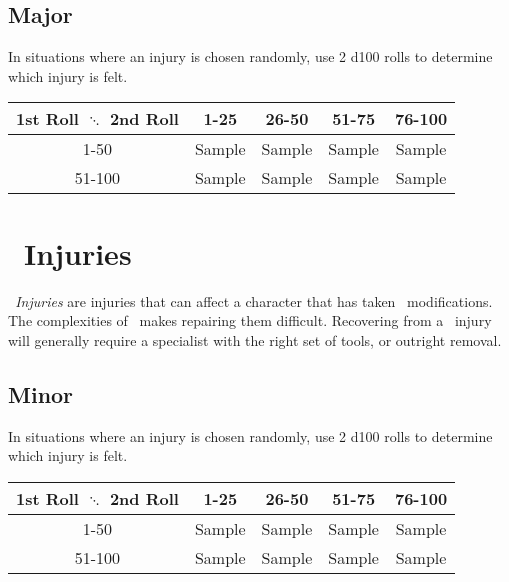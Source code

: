 \subsection{Major}
In situations where an injury is chosen randomly, use 2 d100 rolls to determine which injury is felt.
\begin{center}
\begin{tabular}{c | c | c | c | c}
1st Roll $\ddots$ 2nd Roll & 1-25 & 26-50 & 51-75 & 76-100 \\
\hline
1-50 & Sample & Sample & Sample & Sample\\
\hline
51-100 & Sample & Sample & Sample & Sample\\
\end{tabular}
\end{center}
\begin{multicols}{2}

\end{multicols}

\section{\cybert\ Injuries}\label{sec:cybr_injuries}
\emph{\cybert\ Injuries} are injuries that can affect a character that has taken \cybert\ modifications. The complexities of \cybert\ makes repairing them difficult. Recovering from a \cybert\ injury will generally require a specialist with the right set of tools, or outright removal.

\subsection{Minor}
In situations where an injury is chosen randomly, use 2 d100 rolls to determine which injury is felt.
\begin{center}
\begin{tabular}{c | c | c | c | c}
1st Roll $\ddots$ 2nd Roll & 1-25 & 26-50 & 51-75 & 76-100 \\
\hline
1-50 & Sample & Sample & Sample & Sample\\
\hline
51-100 & Sample & Sample & Sample & Sample\\
\end{tabular}
\end{center}
\begin{multicols}{2}

\end{multicols}
